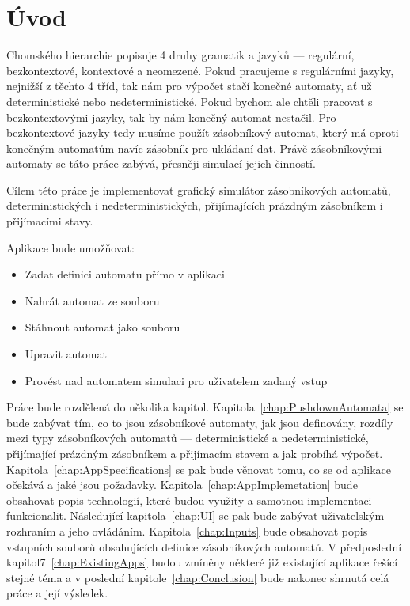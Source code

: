 \chapter{Úvod}    
    Chomského hierarchie popisuje 4 druhy gramatik a jazyků --- regulární, bezkontextové, kontextové a neomezené. Pokud pracujeme s regulárními jazyky, nejnižší z těchto 4 tříd, tak nám pro výpočet stačí konečné automaty, ať už deterministické nebo nedeterministické. Pokud bychom ale chtěli pracovat s bezkontextovými jazyky, tak by nám konečný automat nestačil. Pro bezkontextové jazyky tedy musíme použít zásobníkový automat, který má oproti konečným automatům navíc zásobník pro ukládaní dat. Právě zásobníkovými automaty se táto práce zabývá, přesněji simulací jejich činností.

    Cílem této práce je implementovat grafický simulátor zásobníkových automatů, deterministických i nedeterministických, přijímajících prázdným zásobníkem i přijímacími stavy. 
    
    Aplikace bude umožňovat:

    \begin{itemize}
        \item Zadat definici automatu přímo v aplikaci
        \item Nahrát automat ze souboru
        \item Stáhnout automat jako souboru
        \item Upravit automat
        \item Provést nad automatem simulaci pro uživatelem zadaný vstup
    \end{itemize}

    Práce bude rozdělená do několika kapitol. Kapitola~\ref{chap:PushdownAutomata} se bude zabývat tím, co to jsou zásobníkové automaty, jak jsou definovány, rozdíly mezi typy zásobníkových automatů --- deterministické a nedeterministické, přijímající prázdným zásobníkem a přijímacím stavem a jak probíhá výpočet. Kapitola~\ref{chap:AppSpecifications} se pak bude věnovat tomu, co se od aplikace očekává a jaké jsou požadavky. Kapitola~\ref{chap:AppImplemetation} bude obsahovat popis technologií, které budou využity a samotnou implementaci funkcionalit. Následující kapitola~\ref{chap:UI} se pak bude zabývat uživatelským rozhraním a jeho ovládáním. Kapitola~\ref{chap:Inputs} bude obsahovat popis vstupních souborů obsahujících definice zásobníkových automatů. V předposlední kapitol7~\ref{chap:ExistingApps} budou zmíněny některé již existující aplikace řešící stejné téma a v poslední kapitole~\ref{chap:Conclusion} bude nakonec shrnutá celá práce a její výsledek.
\endinput